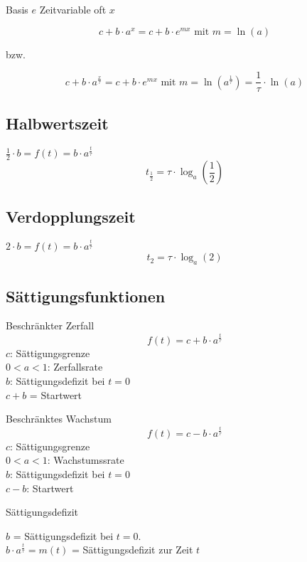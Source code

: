 \begin{multicols}{2}
\begin{gesetz*}{Basis $e$ Zeitvariable oft $x$}{}

$$c+b\cdot{}a^x = c + b\cdot{}e^{mx} \textrm{ mit } m = \ln(a)$$

bzw.

$$c+b\cdot{}a^\frac{x}\tau = c+b\cdot{}e^{mx} \textrm{ mit }
m=\ln(a^\frac1\tau) = \frac1\tau \cdot{}\ln(a)$$

\end{gesetz*}

\subsection*{Halbwertszeit}
$\frac12 \cdot{} b = f(t) = b\cdot{}a^{\frac{t}{\tau}}$
$$t_{\frac12} = \tau\cdot{}\log_a\left(\frac12\right)$$

\subsection*{Verdopplungszeit}
$2\cdot{}b = f(t) = b\cdot{}a^{\frac{t}{\tau}}$
$$t_{2} = \tau\cdot{}\log_a(2)$$

\subsection*{Sättigungsfunktionen}
\begin{gesetz*}{Beschränkter Zerfall}{}
$$f(t) = c + b\cdot{}a^\frac{t}\tau$$
$c$: Sättigungsgrenze\\
$0<a<1$: Zerfallsrate\\
$b$: Sättigungsdefizit bei $t=0$\\
$c+b$ = Startwert 
\end{gesetz*}



\begin{gesetz*}{Beschränktes Wachstum}{}
$$f(t) = c - b\cdot{}a^\frac{t}\tau$$
$c$: Sättigungsgrenze\\
$0<a<1$: Wachstumssrate\\
$b$: Sättigungsdefizit bei $t=0$\\
$c-b$: Startwert
\end{gesetz*}


\begin{bemerkung*}{Sättigungsdefizit}{}

$b$ = Sättigungsdefizit bei $t=0$.\\
$b\cdot{}a^\frac{t}\tau = m(t)$ = Sättigungsdefizit zur Zeit $t$
\end{bemerkung*}

\end{multicols}


